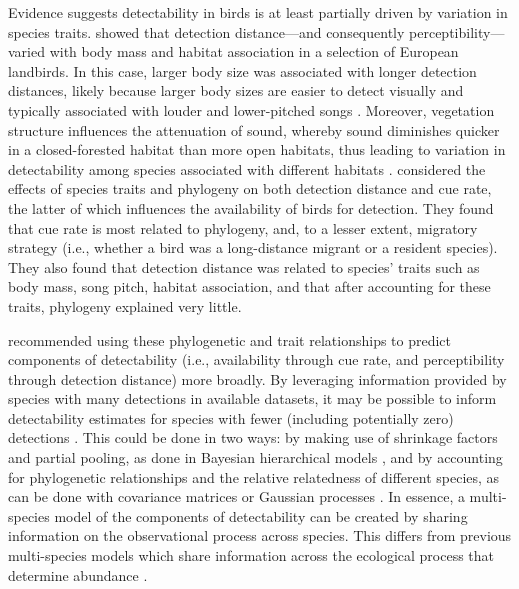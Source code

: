 \documentclass[12pt]{article}
\begin{document}
\par Evidence suggests detectability in birds is at least partially driven by variation in species traits.
\citet{johnston_species_2014} showed that detection distance---and consequently perceptibility---varied with body mass and habitat association in a selection of European landbirds.
In this case, larger body size was associated with longer detection distances, likely because  larger body sizes are easier to detect visually and typically associated with louder and lower-pitched songs \citep{bowman_adaptive_1979, fletcher_acoustics_1999, ryan_role_1985}.
Moreover, vegetation structure influences the attenuation of sound, whereby sound diminishes quicker in a closed-forested habitat than more open habitats, thus leading to variation in detectability among species associated with different habitats \citep{waide_tropical_1988, yip_sound_2017}.
\citet{solymos_phylogeny_2018} considered the effects of species traits and phylogeny on both detection distance and cue rate, the latter of which influences the availability of birds for detection.
They found that cue rate is most related to phylogeny, and, to a lesser extent, migratory strategy (i.e., whether a bird was a long-distance migrant or a resident species).
They also found that detection distance was related to species’ traits such as body mass, song pitch, habitat association, and that after accounting for these traits, phylogeny explained very little.

\par \citet{solymos_phylogeny_2018} recommended using these phylogenetic and trait relationships to predict components of detectability (i.e., availability through cue rate, and perceptibility through detection distance) more broadly.
 By leveraging information provided by species with many detections in available datasets, it may be possible to inform detectability estimates for species with fewer (including potentially zero) detections \citep{sollmann_hierarchical_2016, pacifici_guidelines_2014, zipkin_impacts_2009, white_conservation_2013}.
This could be done in two ways: by making use of shrinkage factors and partial pooling, as done in Bayesian hierarchical models \citep{gelman_what_2021, gelman_bayesian_2006}, and by accounting for phylogenetic relationships and the relative relatedness of different species, as can be done with covariance matrices or Gaussian processes \citep{bernardo_regression_1998, mcelreath_continous_2020}.
In essence, a multi-species model of the components of detectability can be created by sharing information on the observational process across species.
This differs from previous multi-species models which share information across the ecological process that determine abundance \citep{gilbert_multispecies_2024}.
\end{document}
